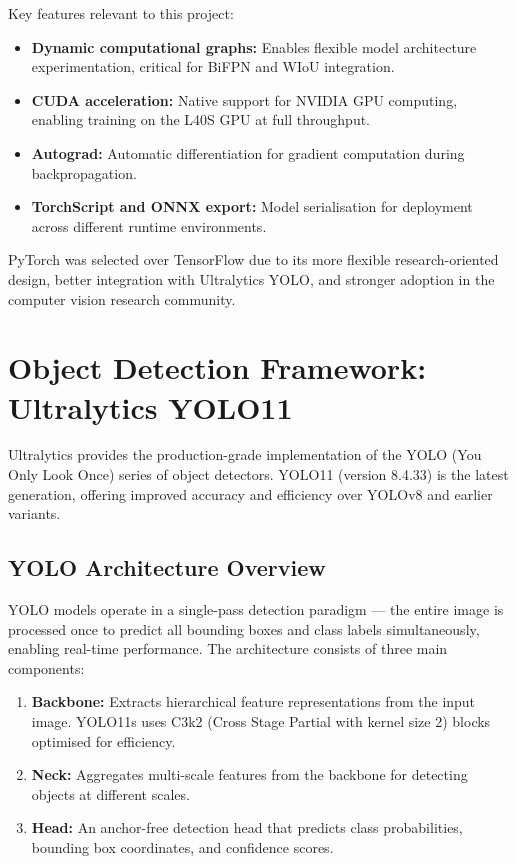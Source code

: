 Key features relevant to this project:
\begin{itemize}
    \item \textbf{Dynamic computational graphs:} Enables flexible model architecture experimentation, critical for BiFPN and WIoU integration.
    \item \textbf{CUDA acceleration:} Native support for NVIDIA GPU computing, enabling training on the L40S GPU at full throughput.
    \item \textbf{Autograd:} Automatic differentiation for gradient computation during backpropagation.
    \item \textbf{TorchScript and ONNX export:} Model serialisation for deployment across different runtime environments.
\end{itemize}

PyTorch was selected over TensorFlow due to its more flexible research-oriented design, better integration with Ultralytics YOLO, and stronger adoption in the computer vision research community.

\section{Object Detection Framework: Ultralytics YOLO11}

Ultralytics \cite{ultralytics2024} provides the production-grade implementation of the YOLO (You Only Look Once) series of object detectors. YOLO11 (version 8.4.33) is the latest generation, offering improved accuracy and efficiency over YOLOv8 and earlier variants.

\subsection{YOLO Architecture Overview}

YOLO models operate in a single-pass detection paradigm — the entire image is processed once to predict all bounding boxes and class labels simultaneously, enabling real-time performance. The architecture consists of three main components:

\begin{enumerate}
    \item \textbf{Backbone:} Extracts hierarchical feature representations from the input image. YOLO11s uses C3k2 (Cross Stage Partial with kernel size 2) blocks optimised for efficiency.
    \item \textbf{Neck:} Aggregates multi-scale features from the backbone for detecting objects at different scales.
    \item \textbf{Head:} An anchor-free detection head that predicts class probabilities, bounding box coordinates, and confidence scores.
\end{enumerate}

